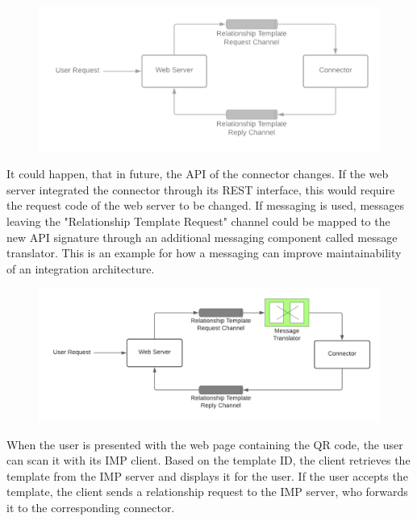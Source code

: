 \begin{figure}[h]
    \centering
    \includegraphics[scale=0.3]{Diagrams/Integration Architecture 1/Overview/Relationship Template Messaging.png}
\end{figure}

It could happen, that in future, the API of the connector changes. If the web server integrated the connector through its REST interface, this would require the request code of the web server to be changed. If messaging is used, messages leaving the "Relationship Template Request" channel could be mapped to the new API signature through an additional messaging component called message translator. This is an example for how a messaging can improve maintainability of an integration architecture.

\begin{figure}[h]
    \centering
    \includegraphics[scale=0.3]{Diagrams/Integration Architecture 1/Overview/Relationship Template Messaging Improved.png}
\end{figure}


When the user is presented with the web page containing the QR code, the user can scan it with its IMP client. Based on the template ID, the client retrieves the template from the IMP server and displays it for the user. If the user accepts the template, the client sends a relationship request to the IMP server, who forwards it to the corresponding connector.

